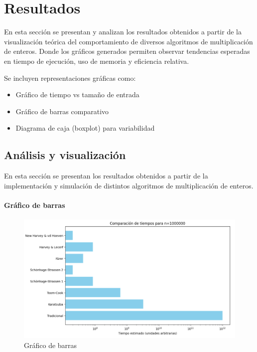 \chapter{Resultados}
\label{ch:results}
En esta sección se presentan y analizan los resultados obtenidos a partir de la visualización teórica del comportamiento de diversos algoritmos de multiplicación de enteros. Donde los gráficos generados permiten observar tendencias esperadas en tiempo de ejecución, uso de memoria y eficiencia relativa. 

Se incluyen representaciones gráficas como:

\begin{itemize}
    \item Gráfico de tiempo vs tamaño de entrada
    \item Gráfico de barras comparativo
    \item Diagrama de caja (boxplot) para variabilidad
\end{itemize}

\section{Análisis y visualización}
En esta sección se presentan los resultados obtenidos a partir de la implementación y simulación de distintos algoritmos de multiplicación de enteros.

\clearpage

\subsubsection{Gráfico de barras}

\begin{figure}[!ht]
    \centering
    \includegraphics[scale=0.7]{figures/graficobarras.png}
    \caption{Gráfico de barras}
    \label{fig:chart_a}
\end{figure}


